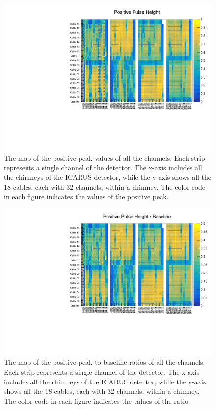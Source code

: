 

\begin{figure}
\centering
\includegraphics[width=\textwidth]{fig/PosPeak.pdf}
\caption{The map of the positive peak values of all the channels.
Each strip represents a single channel of the detector.
The x-axis includes all the chimneys of the ICARUS detector, while
the y-axis shows all the 18 cables, each with 32 channels, within a chimney.
The color code in each figure indicates the values of the positive peak.}
\label{fig:pospeak}
\end{figure}

\begin{figure}
\centering
\includegraphics[width=\textwidth]{fig/PosPeakToBaseline.pdf}
\caption{The map of the positive peak to baseline ratios of all the channels.
Each strip represents a single channel of the detector.
The x-axis includes all the chimneys of the ICARUS detector, while
the y-axis shows all the 18 cables, each with 32 channels, within a chimney.
The color code in each figure indicates the values of the ratio.}
\label{fig:pospeaktobaseline}
\end{figure}

